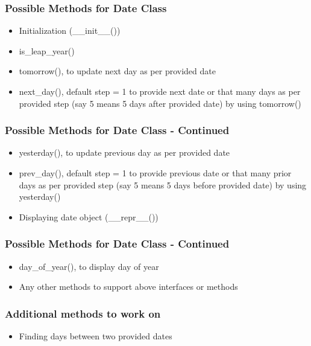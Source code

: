 \documentclass[14pt]{beamer}
\begin{document}
    \begin{frame}[containsverbatim]
        \frametitle{Possible Methods for Date Class}
        \begin{itemize}
        \item Initialization (\_\_init\_\_())
        \item is\_leap\_year()
        \item tomorrow(), to update next day as per provided date
        \item next\_day(), default step = 1 to provide next date or that many days as per provided step (say 5 means 5 days after provided date) by using tomorrow()
        \end{itemize}
    \end{frame}

    \begin{frame}[containsverbatim]
        \frametitle{Possible Methods for Date Class - Continued}
        \begin{itemize}
        \item yesterday(), to update previous day as per provided date
        \item prev\_day(), default step = 1 to provide previous date or that many prior days as per provided step (say 5 means 5 days before provided date) by using yesterday()
        \item Displaying date object (\_\_repr\_\_())
        \end{itemize}
    \end{frame}

    \begin{frame}[containsverbatim]
        \frametitle{Possible Methods for Date Class - Continued}
        \begin{itemize}
        \item day\_of\_year(), to display day of year
        \item Any other methods to support above interfaces or methods
        \end{itemize}
    \end{frame}

    \begin{frame}[containsverbatim]
        \frametitle{Additional methods to work on}
        \begin{itemize}
        \item Finding days between two provided dates
        \end{itemize}
    \end{frame}
\end{document}
